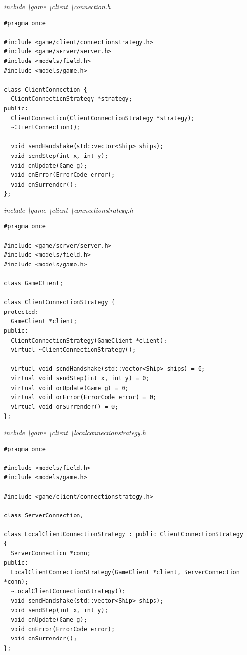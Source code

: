 \documentclass[a4paper,14pt]{extarticle}
\begin{document}
\textit{include \textbackslash game \textbackslash client \textbackslash connection.h}
\begin{verbatim}
#pragma once

#include <game/client/connectionstrategy.h>
#include <game/server/server.h>
#include <models/field.h>
#include <models/game.h>

class ClientConnection {
  ClientConnectionStrategy *strategy;
public:
  ClientConnection(ClientConnectionStrategy *strategy);
  ~ClientConnection();

  void sendHandshake(std::vector<Ship> ships);
  void sendStep(int x, int y);
  void onUpdate(Game g);
  void onError(ErrorCode error);
  void onSurrender();
};

\end{verbatim}
\textit{include \textbackslash game \textbackslash client \textbackslash connectionstrategy.h}
\begin{verbatim}
#pragma once

#include <game/server/server.h>
#include <models/field.h>
#include <models/game.h>

class GameClient;

class ClientConnectionStrategy {
protected:
  GameClient *client;
public:
  ClientConnectionStrategy(GameClient *client);
  virtual ~ClientConnectionStrategy();

  virtual void sendHandshake(std::vector<Ship> ships) = 0;
  virtual void sendStep(int x, int y) = 0;
  virtual void onUpdate(Game g) = 0;
  virtual void onError(ErrorCode error) = 0;
  virtual void onSurrender() = 0;
};

\end{verbatim}
\textit{include \textbackslash game \textbackslash client \textbackslash localconnectionstrategy.h}
\begin{verbatim}
#pragma once

#include <models/field.h>
#include <models/game.h>

#include <game/client/connectionstrategy.h>

class ServerConnection;

class LocalClientConnectionStrategy : public ClientConnectionStrategy {
  ServerConnection *conn;
public:
  LocalClientConnectionStrategy(GameClient *client, ServerConnection *conn);
  ~LocalClientConnectionStrategy();
  void sendHandshake(std::vector<Ship> ships);
  void sendStep(int x, int y);
  void onUpdate(Game g);
  void onError(ErrorCode error);
  void onSurrender();
};

\end{verbatim}
\end{document}
